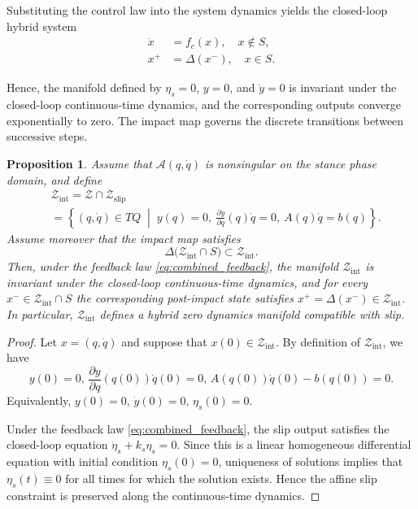 \documentclass[letterpaper, 10 pt, conference]{ieeeconf}
\newtheorem{proposition}{Proposition}
\begin{document}
{Substituting the control law into the system dynamics yields the closed-loop hybrid system
\begin{align}
\dot x &= f_c(x), \quad x\notin S, \label{eq:closed_loop_flow_sec3}\\
x^+ &= \Delta(x^-), \quad x\in S. \label{eq:closed_loop_jump_sec3}
\end{align}

Hence, the manifold defined by $\eta_s=0$, $y=0$, and $\dot y=0$ is invariant under the closed-loop continuous-time dynamics, and the corresponding outputs converge exponentially to zero. The impact map governs the discrete transitions between successive steps.

\begin{proposition}
Assume that $\mathcal A(q,\dot q)$ is nonsingular on the stance phase domain, and define
\begin{align}
&\mathcal Z_{\mathrm{int}}
=
\mathcal Z\cap \mathcal Z_{\mathrm{slip}}
\label{zint}\\
&=
\left\{(q,\dot q)\in TQ \;\middle|\; y(q)=0,\ \frac{\partial y}{\partial q}(q)\dot q=0,\ A(q)\dot q=b(q)\right\}.
\nonumber
\end{align}
Assume moreover that the impact map satisfies
\begin{equation}
\Delta\bigl(\mathcal Z_{\mathrm{int}}\cap S\bigr)\subset \mathcal Z_{\mathrm{int}}.
\label{eq:impact_compatibility_zint}
\end{equation}
Then, under the feedback law \eqref{eq:combined_feedback}, the manifold $\mathcal Z_{\mathrm{int}}$ is invariant under the closed-loop continuous-time dynamics, and for every $x^-\in \mathcal Z_{\mathrm{int}}\cap S$ the corresponding post-impact state satisfies $x^+=\Delta(x^-)\in \mathcal Z_{\mathrm{int}}$. In particular, $\mathcal Z_{\mathrm{int}}$ defines a hybrid zero dynamics manifold compatible with slip.
\end{proposition}

\begin{proof}
Let $x=(q,\dot q)$ and suppose that $x(0)\in\mathcal Z_{\mathrm{int}}$. By definition of $\mathcal Z_{\mathrm{int}}$, we have
\[
y(0)=0,\, \frac{\partial y}{\partial q}(q(0))\dot q(0)=0,\, A(q(0))\dot q(0)-b(q(0))=0.
\]
Equivalently, $y(0)=0,\, \dot y(0)=0,\, \eta_s(0)=0$.


Under the feedback law \eqref{eq:combined_feedback}, the slip output satisfies the closed-loop equation
$\dot\eta_s+k_s\eta_s=0$. Since this is a linear homogeneous differential equation with initial condition $\eta_s(0)=0$, uniqueness of solutions implies that $\eta_s(t)\equiv 0$ for all times for which the solution exists. Hence the affine slip constraint is preserved along the continuous-time dynamics.


\end{proof}}
\end{document}
